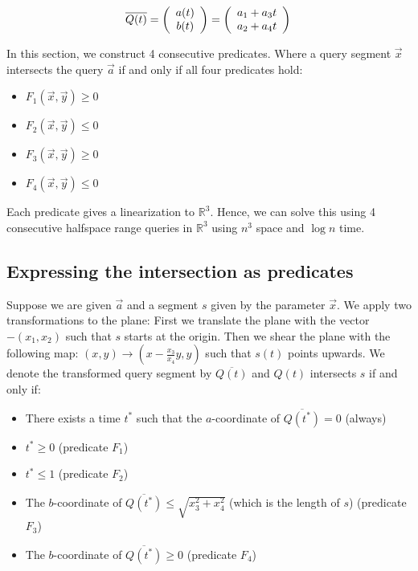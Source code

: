 \documentclass{article}
\begin{document}
\begin{equation}
        \overline{Q(t)} = \left( \begin{array}{c}
         a(t)  \\
         b(t) 
    \end{array}  \right) = \left( \begin{array}{c}
         a_1 +  a_3t  \\
         a_2 + a_4t 
    \end{array} \right)  \\
\end{equation}

In this section, we construct 4 consecutive predicates. Where a query segment $\vec{x}$ intersects the query $\vec{a}$ if and only if all four predicates hold:
\begin{itemize}
    \item $F_1(\vec{x}, \vec{y}) \ge 0$
    \item $F_2(\vec{x}, \vec{y}) \le 0$
    \item $F_3(\vec{x}, \vec{y}) \ge 0$
    \item $F_4(\vec{x}, \vec{y}) \le 0$
\end{itemize}

Each predicate gives a linearization to $\mathbb{R}^3$. Hence, we can solve this using 4 consecutive halfspace range queries in $\mathbb{R}^3$ using $n^3$ space and $\log n$ time.

\subsection{Expressing the intersection as predicates}

Suppose we are given $\vec{a}$ and a segment $s$ given by the parameter $\vec{x}$. We apply two transformations to the plane: First we translate the plane with the vector $-(x_1, x_2)$ such that $s$ starts at the origin. Then we shear the plane with the following map: $(x,y) \rightarrow (x - \frac{x_3}{x_4}y, y)$ such that $s(t)$ points upwards. We denote the transformed query segment by $\overline{Q(t)}$ and $Q(t)$ intersects $s$ if and only if:

\begin{itemize}
    \item There exists a time $t^*$ such that the $a$-coordinate of $\overline{Q(t^*)} = 0$ (always) 
    \item $t^* \ge 0$ (predicate $F_1$)
    \item $t^* \le 1$ (predicate $F_2$)
    \item The $b$-coordinate of $\overline{Q(t^*)} \le \sqrt{x_3^2 + x_4^2}$ (which is the length of $s$) (predicate $F_3$)
    \item The $b$-coordinate of $\overline{Q(t^*)} \ge 0$ (predicate $F_4$)

\end{itemize}
\end{document}
